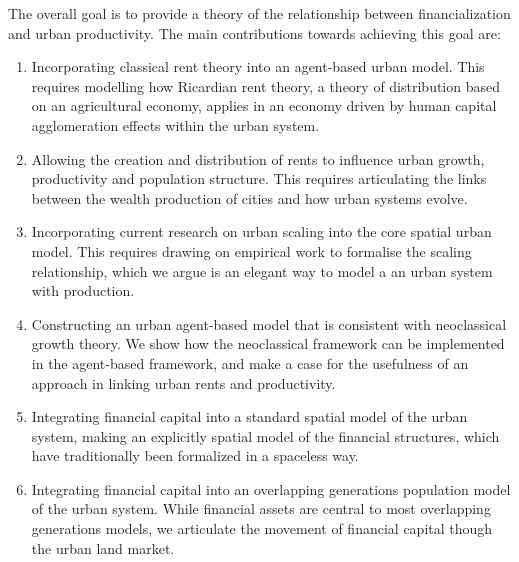 
The overall goal is to provide a theory of the relationship between financialization and urban productivity. The main contributions towards achieving this goal are:
\begin{enumerate}
    \item  Incorporating \gls{classical rent theory} into an \gls{agent-based} urban model. This requires modelling how \gls{Ricardian rent theory}, a theory of distribution based on an agricultural economy, applies %
in an economy driven by human capital \gls{agglomeration} effects within the urban system. 

    \item Allowing the creation and distribution of rents to influence urban growth, productivity and  population structure. This requires articulating the links between the wealth production of cities and  how urban systems evolve.

    \item Incorporating current research on \gls{urban scaling} into the core spatial urban model.  This requires drawing on empirical work to formalise the scaling relationship, which we argue is an
elegant way to model a an urban system with production.

    \item Constructing an urban \gls{agent-based model} that is consistent with {neoclassical growth theory}. We show how the neoclassical framework can be implemented in the agent-based framework, and make a case for the usefulness of an approach in linking urban rents and productivity. %

    \item Integrating \gls{financial capital} into a standard spatial model of the urban system, making an explicitly spatial model of the financial structures, which have traditionally been formalized in a spaceless way.
    
    \item Integrating financial capital into an \gls{overlapping generations} population model of the urban system. While financial assets are central to most overlapping generations models, %
we articulate the movement of financial capital though the urban land market. 
    

\end{enumerate}

